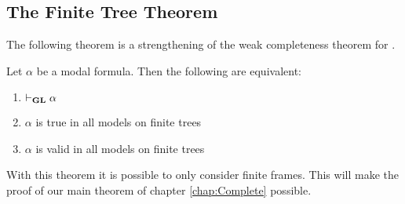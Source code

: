 \documentclass[../main.tex]{subfiles}
\begin{document}
\subsection{The Finite Tree Theorem}
The following theorem is a strengthening of the weak completeness theorem for
\GL. 
\begin{thm}
	Let $\alpha$ be a modal formula. Then the following are equivalent:
	\begin{enumerate}
		\item $\vdash_{\text{\textbf{GL}}}\alpha$
		\item $\alpha$ is true in all models on finite trees
		\item $\alpha$ is valid in all models on finite trees
	\end{enumerate}
\end{thm}
With this theorem it is possible to only consider finite frames. This will make
the proof of our main theorem of chapter \ref{chap:Complete} possible.
\end{document}
